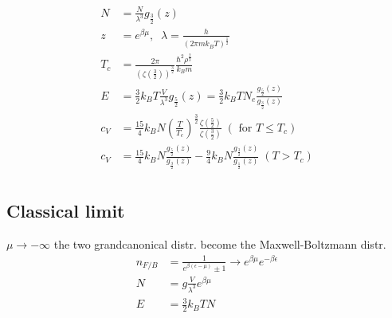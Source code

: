 \[
    \begin{aligned}
        N &= \frac{N}{\lambda^3} g_{\frac{3}{2}} (z) \\
        z &= e^{\beta \mu}, \;\; \lambda = \frac{h}{(2 \pi m k_B T)^{\frac{1}{2}}} \\
        T_c &= \frac{2 \pi}{\left(\zeta\left(\frac{3}{2}\right)\right)^{\frac{3}{2}}} \frac{\hbar^2 \rho^{\frac{2}{3}}}{k_B m} \\
        E &= \frac{3}{2} k_B T \frac{V}{\lambda^3} g_{\frac{5}{2}}(z) = \frac{3}{2} k_B T N_e \frac{g_{\frac{5}{2}}(z)}{g_{\frac{3}{2}}(z)} \\
        c_V &= \frac{15}{4} k_B N \left(\frac{T}{T_c}\right)^{\frac{3}{2}} \frac{\zeta\left(\frac{5}{2}\right)}{\zeta\left(\frac{3}{2}\right)} \;( \text{ for } T \leq T_c) \\
        c_V &= \frac{15}{4} k_B N \frac{g_{\frac{5}{2}}(z)}{g_{\frac{3}{2}}(z)} - \frac{9}{4}k_B N \frac{g_{\frac{3}{2}}(z)}{g_{\frac{1}{2}}(z)}  \;( T > T_c) \\
    \end{aligned}
\]

\subsection*{Classical limit}
$\mu \rightarrow - \infty$ the two grandcanonical distr. become the Maxwell-Boltzmann distr.
\[
    \begin{aligned}
        n_{F/B} &= \frac{1}{e^{\beta(\epsilon-\mu)}\pm1} \rightarrow e^{\beta \mu} e^{-\beta \epsilon} \\
        N &= g \frac{V}{\lambda^3} e^{\beta \mu} \\
        E &= \frac{3}{2} k_B T N
    \end{aligned}
\]